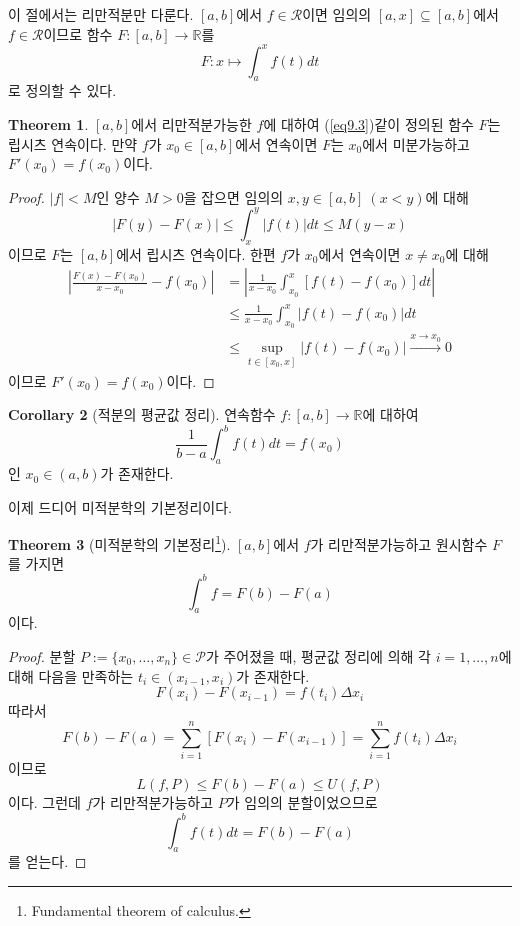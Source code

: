 \documentclass[11pt]{book}
\numberwithin{equation}{chapter}
\def\RR{\mathbb{R}}
\def\calP{\mathcal{P}}
\def\calR{\mathcal{R}}
\newcommand{\abs}[1]{\left\vert#1\right\vert}
\theoremstyle{definition}
\newtheorem{thm}{Theorem}[section]
\newtheorem{cor}[thm]{Corollary}
\begin{document}
이 절에서는 리만적분만 다룬다. \([a, b]\)에서 \(f \in \calR\)이면 임의의 \([a, x] \subseteq [a, b]\)에서 \(f \in \calR\)이므로 함수 \(F : [a, b] \to \RR\)를
\begin{equation} \label{eq9.3}
    F : x \mapsto \int_a^x f (t) dt
\end{equation}
로 정의할 수 있다.

\begin{thm}
    \([a, b]\)에서 리만적분가능한 \(f\)에 대하여 (\ref{eq9.3})\과 같이 정의된 함수 \(F\)는 립시츠 연속이다. 만약 \(f\)가 \(x_0 \in [a, b]\)에서 연속이면 \(F\)는 \(x_0\)에서 미분가능하고 \(F'(x_0) = f(x_0)\)이다.
\end{thm}
\begin{proof}
    \(\abs{f} < M\)인 양수 \(M > 0\)을 잡으면 임의의 \(x, y \in [a, b] \ (x < y)\)에 대해
    \[
        \abs{F(y) - F(x)} \le \int_x^y \abs{f(t)} dt \le M(y - x)
    \]
    이므로 \(F\)는 \([a, b]\)에서 립시츠 연속이다. 한편 \(f\)가 \(x_0\)에서 연속이면 \(x \ne x_0\)에 대해
    \begin{align*}
        \abs{\frac{F(x) - F(x_0)}{x - x_0} - f(x_0)} &= \abs{\frac{1}{x - x_0} \int_{x_0}^x [f(t) - f(x_0)] dt}\\
        &\le \frac{1}{x - x_0} \int_{x_0}^x \abs{f(t) - f(x_0)} dt\\
        &\le \sup_{t \in [x_0, x]} \abs{f(t) - f(x_0)} \xrightarrow[]{x \to x_0} 0
    \end{align*}
    이므로 \(F'(x_0) = f(x_0)\)이다.
\end{proof}

\begin{cor}[적분의 평균값 정리]
    연속함수 \(f : [a, b] \to \RR\)에 대하여
    \[
        \frac{1}{b-a} \int_a^b f(t) dt = f(x_0)
    \]
    인 \(x_0 \in (a, b)\)가 존재한다.
\end{cor}

이제 드디어 미적분학의 기본정리이다.

\begin{thm}[미적분학의 기본정리\footnote{Fundamental theorem of calculus.}]
    \([a, b]\)에서 \(f\)가 리만적분가능하고 원시함수 \(F\)를 가지면
    \[
        \int_a^b f = F(b) - F(a)
    \]
    이다.
\end{thm}
\begin{proof}
    분할 \(P := \{x_0, \ldots, x_n\} \in \calP\)가 주어졌을 때, 평균값 정리에 의해 각 \(i = 1, \ldots, n\)에 대해 다음을 만족하는 \(t_i \in (x_{i-1}, x_i)\)가 존재한다.
    \[
        F(x_i) - F(x_{i-1}) = f(t_i) \Delta x_i
    \]
    따라서
    \[
        F(b) - F(a) = \sum_{i=1}^n [F(x_i) - F(x_{i-1})] = \sum_{i=1}^n f(t_i) \Delta x_i
    \]
    이므로
    \[
        L(f, P) \le F(b) - F(a) \le U(f, P)
    \]
    이다. 그런데 \(f\)가 리만적분가능하고 \(P\)가 임의의 분할이었으므로
    \[
        \int_a^b f(t)dt = F(b) - F(a)
    \]
    를 얻는다.
\end{proof}
\end{document}
